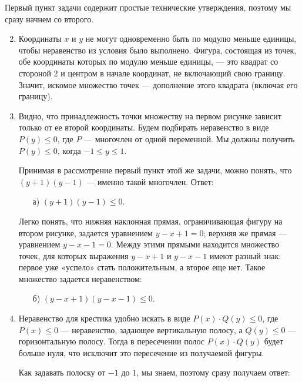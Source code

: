 ﻿

Первый пункт задачи содержит простые технические утверждения, поэтому мы сразу начнем со второго.

\begin{enumerate}
\setcounter{enumi}{1}

\item Координаты $x$ и $y$ не могут одновременно быть по модулю меньше единицы, чтобы неравенство из условия было выполнено. Фигура, состоящая из точек, обе координаты которых по модулю меньше единицы, — это квадрат со стороной 2 и центром в начале координат, не включающий свою границу. Значит, искомое множество точек — дополнение этого квадрата (включая его границу).

\item Видно, что принадлежность точки множеству на первом рисунке зависит только от ее второй координаты. Будем подбирать неравенство в виде $P(y) \le 0$, где $P$ — многочлен от одной переменной. Мы должны получить $P(y) \le 0$, когда $-1 \le y \le 1$.

Принимая в рассмотрение первый пункт этой же задачи, можно понять, что $(y+1)(y-1)$ — именно такой многочлен. Ответ:

\begin{enumerate}
	\item[а)] $(y+1)(y-1) \le 0$.
\end{enumerate}

Легко понять, что нижняя наклонная прямая, ограничивающая фигуру на втором рисунке, задается уравнением $y-x+1=0$; верхняя же прямая — уравнением $y-x-1=0$. Между этими прямыми находится множество точек, для которых выражения $y-x+1$ и $y-x-1$ имеют разный знак: первое уже «успело» стать положительным, а второе еще нет. Такое множество задается неравенством:

\begin{enumerate}
	\item[б)] $(y-x+1)(y-x-1) \le 0$.
\end{enumerate}

\item Неравенство для крестика удобно искать в виде $P(x) \cdot Q(y) \le 0$, где $P(x) \le 0$ — неравенство, задающее вертикальную полосу, а $Q(y) \le 0$ — горизонтальную полосу. Тогда в пересечении полос $P(x) \cdot Q(y)$ будет больше нуля, что исключит это пересечение из получаемой фигуры.

Как задавать полоску от $-1$ до $1$, мы знаем, поэтому сразу получаем ответ:


\end{enumerate}
